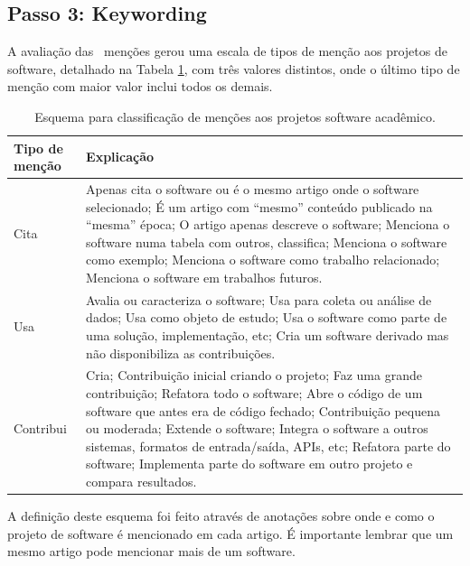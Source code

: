 \subsection{Passo 3: Keywording}

A avaliação das \ScreeningCount \ menções gerou uma escala de tipos de menção
aos projetos de software, detalhado na Tabela \ref{esquema-de-mencao}, com três valores
distintos, onde o último tipo de menção com maior valor inclui todos os demais.

\begin{table}[h]
\caption{Esquema para classificação de menções aos projetos software acadêmico.}
\centering
\begin{tabular}{ l p{10cm} }
  \hline
  Tipo de menção           & Explicação \\
  \hline
  Cita      & Apenas cita o software ou é o mesmo artigo onde o software selecionado; É um artigo com ``mesmo'' conteúdo publicado na ``mesma'' época; O artigo apenas descreve o software; Menciona o software numa tabela com outros, classifica; Menciona o software como exemplo; Menciona o software como trabalho relacionado; Menciona o software em trabalhos futuros. \\
  Usa       & Avalia ou caracteriza o software; Usa para coleta ou análise de dados; Usa como objeto de estudo; Usa o software como parte de uma solução, implementação, etc; Cria um software derivado mas não disponibiliza as contribuições. \\
  Contribui & Cria; Contribuição inicial criando o projeto; Faz uma grande contribuição; Refatora todo o software; Abre o código de um software que antes era de código fechado; Contribuição pequena ou moderada; Extende o software; Integra o software a outros sistemas, formatos de entrada/saída, APIs, etc; Refatora parte do software; Implementa parte do software em outro projeto e compara resultados. \\
  \hline
\end{tabular}
\label{esquema-de-mencao}
\end{table}

A definição deste esquema foi feito através de anotações sobre onde e como o
projeto de software é mencionado em cada artigo.
É importante lembrar que um mesmo artigo pode mencionar
mais de um software.


